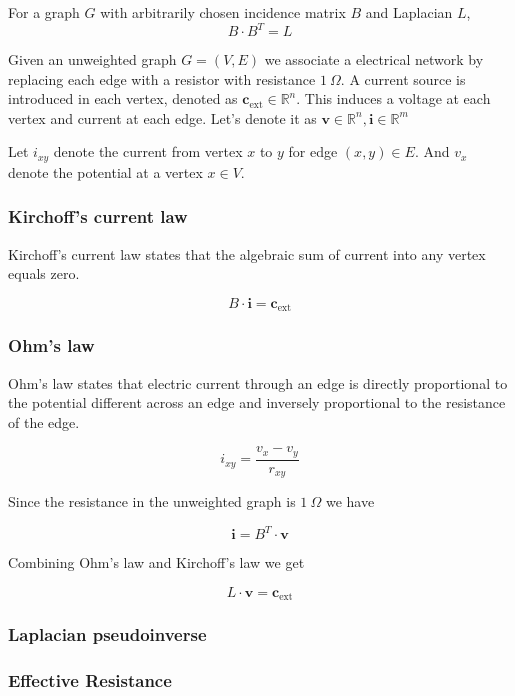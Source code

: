 \begin{Bf}
 For a graph $G$ with arbitrarily chosen incidence matrix $B$ and Laplacian $L$, 
 $$B \cdot B^T = L$$
\end{Bf}


Given an unweighted graph $G = (V,E)$ we associate a electrical network by replacing each edge with a resistor with resistance $1 \ \Omega$. A current source is introduced in each vertex, denoted as $\textbf{c}_{\text{ext}} \in \mathbb{R}^n$. This induces a voltage at each vertex and current at each edge. Let's denote it as $\textbf{v} \in \mathbb{R}^n, \textbf{i} \in \mathbb{R}^m$



Let $i_{xy}$ denote the current from vertex $x$ to $y$ for edge $(x,y) \in E$. And $v_x$ denote the potential at a vertex $x \in V$.

\subsubsection{Kirchoff's current law}

Kirchoff's current law states that the algebraic sum of current into any vertex equals zero. 

$$ B \cdot \textbf{i} = \textbf{c}_{\text{ext}} $$

\subsubsection{Ohm's law}
Ohm's law states that electric current through an edge is directly proportional to the potential different across an edge and inversely proportional to the resistance of the edge.

$$ i_{xy} = \frac{v_x - v_y}{r_{xy}} $$

Since the resistance in the unweighted graph is $1 \ \Omega$ we have 

$$ \textbf{i} = B^T \cdot \textbf{v} $$ 

Combining Ohm's law and Kirchoff's law we get 

$$ L \cdot \textbf{v} = \textbf{c}_{\text{ext}} $$ 

\subsubsection{Laplacian pseudoinverse}



\subsubsection{Effective Resistance}

